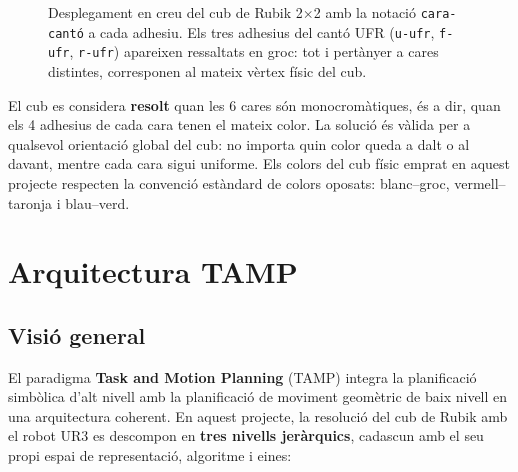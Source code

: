 \documentclass[12pt, a4paper]{article}
\begin{document}
\begin{figure}[H]
  \caption{Desplegament en creu del cub de Rubik 2$\times$2 amb la notació \texttt{cara-cantó} a cada adhesiu. Els tres adhesius del cantó UFR (\texttt{u-ufr}, \texttt{f-ufr}, \texttt{r-ufr}) apareixen ressaltats en groc: tot i pertànyer a cares distintes, corresponen al mateix vèrtex físic del cub.}
  \label{fig:corner_ufr}
\end{figure}

El cub es considera \textbf{resolt} quan les 6 cares són monocromàtiques, és a dir, quan els 4 adhesius de cada cara tenen el mateix color. La solució és vàlida per a qualsevol orientació global del cub: no importa quin color queda a dalt o al davant, mentre cada cara sigui uniforme. Els colors del cub físic emprat en aquest projecte respecten la convenció estàndard de colors oposats: blanc--groc, vermell--taronja i blau--verd.
\section{Arquitectura TAMP}

\subsection{Visió general}

El paradigma \textbf{Task and Motion Planning} (TAMP) integra la planificació simbòlica d'alt nivell amb la planificació de moviment geomètric de baix nivell en una arquitectura coherent. En aquest projecte, la resolució del cub de Rubik amb el robot UR3 es descompon en \textbf{tres nivells jeràrquics}, cadascun amb el seu propi espai de representació, algoritme i eines:
\end{document}

